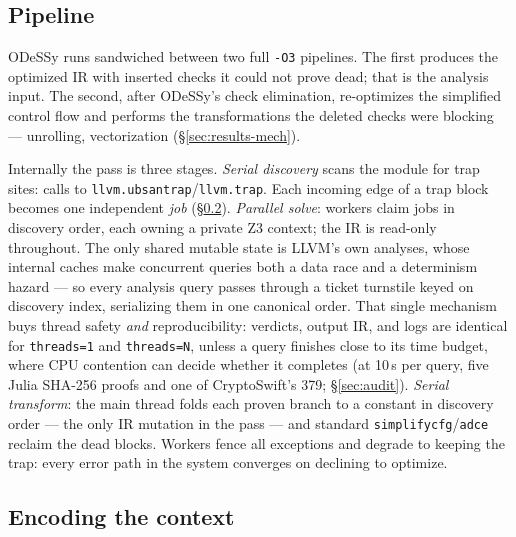\documentclass[acmsmall,screen,nonacm]{acmart}
\newcommand{\odessy}{ODeSSy}
\newcommand{\tool}{\odessy}
\begin{document}
\subsection{Pipeline}
\label{sec:pipeline}
\tool{} runs sandwiched between two full \texttt{-O3} pipelines. The
first produces the optimized IR with inserted checks it could not prove dead; that is the analysis
input. The second, after \tool{}'s check elimination, re-optimizes the simplified
control flow and performs the transformations the deleted checks were
blocking --- unrolling, vectorization (\S\ref{sec:results-mech}). 

Internally the pass is three stages. \emph{Serial discovery} scans the
module for trap sites: calls to
\texttt{llvm.ubsantrap}/\texttt{llvm.trap}. Each incoming edge of a
trap block becomes one independent \emph{job}
(\S\ref{sec:encoding-impl}).
\emph{Parallel solve}: workers claim jobs in discovery order, each
owning a private Z3 context; the IR is read-only throughout. The only
shared mutable state is LLVM's own analyses, whose internal caches make
concurrent queries both a data race and a determinism hazard --- so
every analysis query passes through a ticket turnstile keyed on
discovery index, serializing them in one canonical order. That single
mechanism buys thread safety \emph{and} reproducibility: verdicts,
output IR, and logs are identical for \texttt{threads=1} and
\texttt{threads=N}, unless a query finishes close to its time budget, where
CPU contention can decide whether it completes (at 10\,s per query, five
Julia SHA-256 proofs and one of CryptoSwift's 379; \S\ref{sec:audit}). \emph{Serial
transform}: the main thread folds each proven branch to a constant in
discovery order --- the only IR mutation in the pass --- and standard
\texttt{simplifycfg}/\texttt{adce} reclaim the dead blocks. Workers
fence all exceptions and degrade to keeping the trap: every error path
in the system converges on declining to optimize.

\subsection{Encoding the context}
\label{sec:encoding-impl}
\label{sec:encoding-context}
\end{document}
